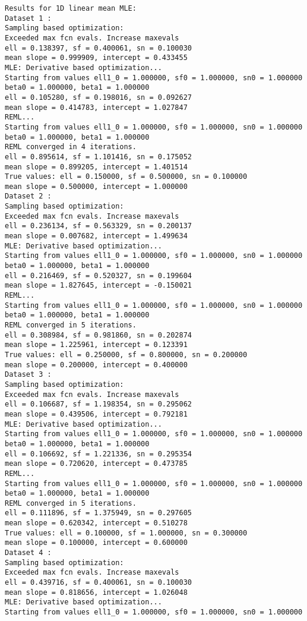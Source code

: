         \color{lightgray} \begin{verbatim}
Results for 1D linear mean MLE:
Dataset 1 : 
Sampling based optimization:
Exceeded max fcn evals. Increase maxevals
ell = 0.138397, sf = 0.400061, sn = 0.100030 
mean slope = 0.999909, intercept = 0.433455 
MLE: Derivative based optimization...
Starting from values ell1_0 = 1.000000, sf0 = 1.000000, sn0 = 1.000000 
beta0 = 1.000000, beta1 = 1.000000 
ell = 0.105280, sf = 0.198016, sn = 0.092627 
mean slope = 0.414783, intercept = 1.027847 
REML...
Starting from values ell1_0 = 1.000000, sf0 = 1.000000, sn0 = 1.000000 
beta0 = 1.000000, beta1 = 1.000000 
REML converged in 4 iterations. 
ell = 0.895614, sf = 1.101416, sn = 0.175052 
mean slope = 0.899205, intercept = 1.401514 
True values: ell = 0.150000, sf = 0.500000, sn = 0.100000 
mean slope = 0.500000, intercept = 1.000000 
Dataset 2 : 
Sampling based optimization:
Exceeded max fcn evals. Increase maxevals
ell = 0.236134, sf = 0.563329, sn = 0.200137 
mean slope = 0.007682, intercept = 1.499634 
MLE: Derivative based optimization...
Starting from values ell1_0 = 1.000000, sf0 = 1.000000, sn0 = 1.000000 
beta0 = 1.000000, beta1 = 1.000000 
ell = 0.216469, sf = 0.520327, sn = 0.199604 
mean slope = 1.827645, intercept = -0.150021 
REML...
Starting from values ell1_0 = 1.000000, sf0 = 1.000000, sn0 = 1.000000 
beta0 = 1.000000, beta1 = 1.000000 
REML converged in 5 iterations. 
ell = 0.308984, sf = 0.981860, sn = 0.202874 
mean slope = 1.225961, intercept = 0.123391 
True values: ell = 0.250000, sf = 0.800000, sn = 0.200000 
mean slope = 0.200000, intercept = 0.400000 
Dataset 3 : 
Sampling based optimization:
Exceeded max fcn evals. Increase maxevals
ell = 0.106687, sf = 1.198354, sn = 0.295062 
mean slope = 0.439506, intercept = 0.792181 
MLE: Derivative based optimization...
Starting from values ell1_0 = 1.000000, sf0 = 1.000000, sn0 = 1.000000 
beta0 = 1.000000, beta1 = 1.000000 
ell = 0.106692, sf = 1.221336, sn = 0.295354 
mean slope = 0.720620, intercept = 0.473785 
REML...
Starting from values ell1_0 = 1.000000, sf0 = 1.000000, sn0 = 1.000000 
beta0 = 1.000000, beta1 = 1.000000 
REML converged in 5 iterations. 
ell = 0.111896, sf = 1.375949, sn = 0.297605 
mean slope = 0.620342, intercept = 0.510278 
True values: ell = 0.100000, sf = 1.000000, sn = 0.300000 
mean slope = 0.100000, intercept = 0.600000 
Dataset 4 : 
Sampling based optimization:
Exceeded max fcn evals. Increase maxevals
ell = 0.439716, sf = 0.400061, sn = 0.100030 
mean slope = 0.818656, intercept = 1.026048 
MLE: Derivative based optimization...
Starting from values ell1_0 = 1.000000, sf0 = 1.000000, sn0 = 1.000000 

\end{verbatim}
